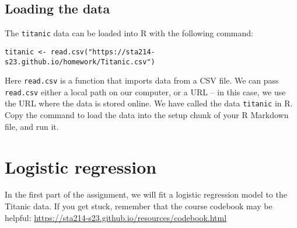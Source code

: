 \documentclass[11pt]{article}
\begin{document}
\subsection*{Loading the data}

The \verb;titanic; data can be loaded into R with the following command:

\begin{verbatim}
titanic <- read.csv("https://sta214-s23.github.io/homework/Titanic.csv")
\end{verbatim}

\noindent Here \texttt{read.csv} is a function that imports data from a CSV file. We can pass \texttt{read.csv} either a local path on our computer, or a URL -- in this case, we use the URL where the data is stored online. We have called the data \verb;titanic; in R.\\

\noindent Copy the command to load the data into the setup chunk of your R Markdown file, and run it.

\newpage

\section{Logistic regression}

In the first part of the assignment, we will fit a logistic regression model to the Titanic data. If you get stuck, remember that the course codebook may be helpful: \url{https://sta214-s23.github.io/resources/codebook.html} 
\end{document}
